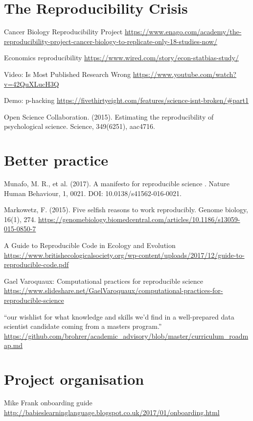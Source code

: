 \documentclass[]{book}
\begin{document}
\section{The Reproducibility Crisis}\label{the-reproducibility-crisis}

Cancer Biology Reproducibility Project
\url{https://www.enago.com/academy/the-reproducibility-project-cancer-biology-to-replicate-only-18-studies-now/}

Economics reproducibility
\url{https://www.wired.com/story/econ-statbias-study/}

Video: Is Most Published Research Wrong
\url{https://www.youtube.com/watch?v=42QuXLucH3Q}

Demo: p-hacking
\url{https://fivethirtyeight.com/features/science-isnt-broken/\#part1}

Open Science Collaboration. (2015). Estimating the reproducibility of
psychological science. Science, 349(6251), aac4716.

\section{Better practice}\label{better-practice}

Munafo, M. R., et al. (2017). A manifesto for reproducible science .
Nature Human Behaviour, 1, 0021. DOI: 10.0138/s41562-016-0021.

Markowetz, F. (2015). Five selfish reasons to work reproducibly. Genome
biology, 16(1), 274.
\url{https://genomebiology.biomedcentral.com/articles/10.1186/s13059-015-0850-7}

A Guide to Reproducible Code in Ecology and Evolution
\url{https://www.britishecologicalsociety.org/wp-content/uploads/2017/12/guide-to-reproducible-code.pdf}

Gael Varoquaux: Computational practices for reproducible science
\url{https://www.slideshare.net/GaelVaroquaux/computational-practices-for-reproducible-science}

``our wishlist for what knowledge and skills we'd find in a
well-prepared data scientist candidate coming from a masters program.''
\url{https://github.com/brohrer/academic_advisory/blob/master/curriculum_roadmap.md}

\section{Project organisation}\label{project-organisation-1}

Mike Frank onboarding guide
\url{http://babieslearninglanguage.blogspot.co.uk/2017/01/onboarding.html}
\end{document}
